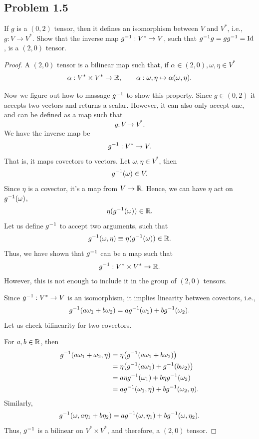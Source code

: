 	\subsection*{
		Problem 1.5
	}
	\begin{problem}
		If $g$ is a $(0,2)$ tensor, then it defines an isomorphism between $V$ and $V^*$,
		i.e., $g:V\to V^*$. Show that the inverse map $g^{-1}: V^* \to V$, such that 
		$g^{-1} g = gg^{-1} = \mathrm{Id}$, is a $(2,0)$ tensor.
	\end{problem}
	\begin{solution_pset}
			\begin{proof}
				A $(2,0)$ tensor is a bilinear map such that, if $\alpha\in(2,0), \omega,\eta\in V^*$
				\[
					\alpha:V^*\times V^*\to \mathbb{R},\qquad \alpha:\omega,\eta\mapsto \alpha(\omega,\eta).
				\]

				Now we figure out how to massage $g^{-1}$ to show this property.
				Since $g\in(0,2)$ it accepts two vectors and returns a scalar. 
				However, it can also only accept one,
				and can be defined as a map such that
				\[
					g: V \to V^*.
				\]
				We have the inverse map be 
				\[
					g^{-1}: V^* \to V.
				\]
				That is, it maps covectors to vectors. Let $\omega,\eta\in V^*$,
				then
				\[
					g^{-1}(\omega) \in V.
				\]
				Since $\eta$ is a covector, it's a map from $V\to \mathbb{R}$. Hence, we can
				have $\eta$ act on $g^{-1}(\omega)$,
				\[
					\eta(g^{-1}(\omega))\in\mathbb{R}.
				\]
				Let us define $g^{-1}$ to accept two arguments, such that
				\[
					g^{-1}(\omega,\eta)\equiv
					\eta(g^{-1}(\omega)) \in \mathbb{R}.
				\]
				Thus, we have shown that $g^{-1}$ can be a map such that
				\[
					g^{-1}:V^*\times V^* \to \mathbb{R}.
				\]
				However, this is not enough to include it in the group of $(2,0)$ tensors.

				Since $g^{-1}:V^* \to V$ is an isomorphism, it implies linearity between covectors, i.e.,
				\[
					g^{-1}(a \omega_1 + b \omega_2) = a g^{-1}(\omega_1)+ b g^{-1}(\omega_2).
				\]
				Let us check bilinearity for two covectors. 

				For $a,b\in\mathbb{R}$, then
				\begin{align*}
					g^{-1}(a\omega_1 + \omega_2, \eta)
					&=
					\eta\qty(g^{-1}(a\omega_1 + b\omega_2))\\
					&=
					\eta\qty(g^{-1}(a\omega_1) + g^{-1}(b\omega_2))\\
					&=
					a \eta g^{-1}(\omega_1) + b \eta g^{-1}(\omega_2)\\
					&=
					a g^{-1}(\omega_1,\eta) + b  g^{-1}(\omega_2,\eta).
				\end{align*}
				Similarly,
				\[
					g^{-1}(\omega,a\eta_1 + b\eta_2) = a g^{-1}(\omega,\eta_1) + b g^{-1}(\omega,\eta_2).
				\]
				Thus, $g^{-1}$ is a bilinear on $V^* \times V^*$, and therefore, a $(2,0)$ tensor.
			\end{proof}


\end{solution_pset}
